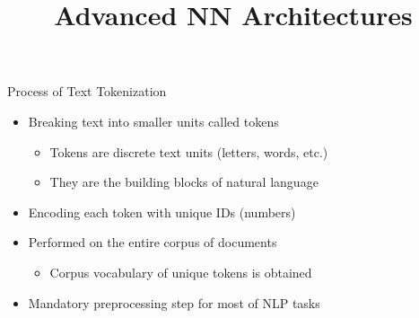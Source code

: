 



\newcommand{\titlefigure}{figure/tokenization.jpeg}
\newcommand{\learninggoals}{
\item Understand the the process of text tokenization
\item Learn the various types of text tokenization}

\title{Advanced NN Architectures}
\date{}




\begin{vbframe}{Process of Text Tokenization}

\vfill

\begin{itemize}
	\item Breaking text into smaller units called tokens
		\begin{itemize}
			\item Tokens are discrete text units (letters, words, etc.)
			\item They are the building blocks of natural language
		\end{itemize}
	\item Encoding each token with unique IDs (numbers)
	\item Performed on the entire corpus of documents
		\begin{itemize}
			\item Corpus vocabulary of unique tokens is obtained
		\end{itemize}
	\item Mandatory preprocessing step for most of NLP tasks

\end{itemize}

\vfill

\end{vbframe}


